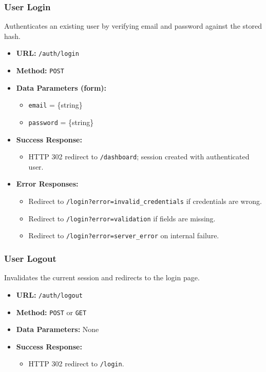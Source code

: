 \subsubsection{User Login}

Authenticates an existing user by verifying email and password against the stored hash.

\begin{itemize}
    \item \textbf{URL:} \texttt{/auth/login}
    \item \textbf{Method:} \texttt{POST}
    \item \textbf{Data Parameters (form):}
    \begin{itemize}
        \item \texttt{email} = \{string\}
        \item \texttt{password} = \{string\}
    \end{itemize}
    \item \textbf{Success Response:}
    \begin{itemize}
        \item HTTP 302 redirect to \texttt{/dashboard}; session created with authenticated user.
    \end{itemize}
    \item \textbf{Error Responses:}
    \begin{itemize}
        \item Redirect to \texttt{/login?error=invalid\_credentials} if credentials are wrong.
        \item Redirect to \texttt{/login?error=validation} if fields are missing.
        \item Redirect to \texttt{/login?error=server\_error} on internal failure.
    \end{itemize}
\end{itemize}

\subsubsection{User Logout}

Invalidates the current session and redirects to the login page.

\begin{itemize}
    \item \textbf{URL:} \texttt{/auth/logout}
    \item \textbf{Method:} \texttt{POST} or \texttt{GET}
    \item \textbf{Data Parameters:} None
    \item \textbf{Success Response:}
    \begin{itemize}
        \item HTTP 302 redirect to \texttt{/login}.
    \end{itemize}
\end{itemize}

